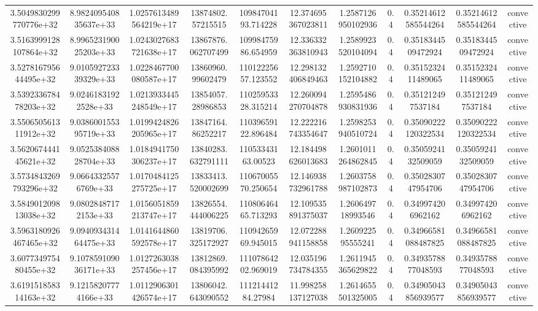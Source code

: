 \begin{table}
\begin{tabular}{ccccccccccc}
3.5049830299770776e+32 & 8.982409540835637e+33 & 1.0257613489564219e+17 & 13874802.57215515 & 10984704193.714228 & 12.374695367023811 & 1.2587126950102936 & 0.4 & 0.35214612585544264 & 0.35214612585544264 & convective \\
3.5163999128107864e+32 & 8.996523190025203e+33 & 1.0243027683721638e+17 & 13867876.062707499 & 10998475986.654959 & 12.336332363810943 & 1.2589923520104094 & 0.4 & 0.3518344509472924 & 0.3518344509472924 & convective \\
3.527816795644495e+32 & 9.010592723339329e+33 & 1.0228467700080587e+17 & 13860960.99602479 & 11012225657.123552 & 12.298132406849463 & 1.2592710152104882 & 0.4 & 0.3515232411489065 & 0.3515232411489065 & convective \\
3.539233678478203e+32 & 9.02461831922528e+33 & 1.0213933445248549e+17 & 13854057.28986853 & 11025953328.315214 & 12.260094270704878 & 1.2595486930831936 & 0.4 & 0.351212497537184 & 0.351212497537184 & convective \\
3.550650561311912e+32 & 9.038600155395719e+33 & 1.0199424826205965e+17 & 13847164.86252217 & 11039659122.896484 & 12.222216743354647 & 1.2598253940510724 & 0.4 & 0.35090222120322534 & 0.35090222120322534 & convective \\
3.562067444145621e+32 & 9.052538408828704e+33 & 1.0184941750306237e+17 & 13840283.632791111 & 11053343163.00523 & 12.184498626013683 & 1.2601011264862845 & 0.4 & 0.3505924132509059 & 0.3505924132509059 & convective \\
3.5734843269793296e+32 & 9.06643325576769e+33 & 1.0170484125275725e+17 & 13833413.520002699 & 11067005570.250654 & 12.146938732961788 & 1.2603758987102873 & 0.4 & 0.3502830747954706 & 0.3502830747954706 & convective \\
3.584901209813038e+32 & 9.08028487172153e+33 & 1.0156051859213747e+17 & 13826554.444006225 & 11080646465.713293 & 12.109535891375037 & 1.260649718993546 & 0.4 & 0.349974206962162 & 0.349974206962162 & convective \\
3.5963180926467465e+32 & 9.094093431464475e+33 & 1.0141644860592578e+17 & 13819706.325172927 & 11094265969.945015 & 12.072288941158858 & 1.260922595555241 & 0.4 & 0.34966581088487825 & 0.34966581088487825 & convective \\
3.607734975480455e+32 & 9.107859109036171e+33 & 1.0127263038257456e+17 & 13812869.084395992 & 11107864202.969019 & 12.035196734784355 & 1.2611945365629822 & 0.4 & 0.3493578877048593 & 0.3493578877048593 & convective \\
3.619151858314163e+32 & 9.12158207774166e+33 & 1.0112906301426574e+17 & 13806042.643090552 & 11121441284.27984 & 11.998258137127038 & 1.2614655501325005 & 0.4 & 0.34905043856939577 & 0.34905043856939577 & convective \\

\end{tabular}
\end{table}
